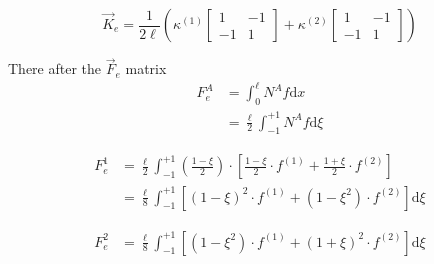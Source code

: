 \begin{equation}\label{Keass2}
\vec{K}_e = \frac{1}{2\ell} \left(
	\kappa^{(1)} \begin{bmatrix} 1 & -1 \\ -1 & 1 \end{bmatrix}
	+ \kappa^{(2)} \begin{bmatrix} 1 & -1 \\ -1 & 1 \end{bmatrix}
\right)
\end{equation}

There after the $\vec{F}_e$ matrix
\begin{equation}\label{Keass3}
\begin{aligned}
F_e^A &= \int_0^\ell N^A f \text{d}x \\
&= \frac{\ell}{2} \int_{-1}^{+1} N^A f \text{d} \xi
\end{aligned}
\end{equation}


\begin{equation}\label{Feass4}
\begin{aligned}
F_e^1 &= \frac{\ell}{2} \int_{-1}^{+1} \left(\frac{1-\xi}{2}\right) \cdot \left[
	\frac{1-\xi}{2}\cdot f^{(1)}
	+ \frac{1+\xi}{2}\cdot f^{(2)}
\right] \\
&= \frac{\ell}{8} \int_{-1}^{+1} \left[
	\left(1-\xi\right)^2\cdot f^{(1)}
	+ \left(1-\xi^2\right)\cdot f^{(2)}
\right] \text{d} \xi
\end{aligned}
\end{equation}

\begin{equation}\label{Feass5}
\begin{aligned}
F_e^2 &= \frac{\ell}{8} \int_{-1}^{+1} \left[
	(1-\xi^2)\cdot f^{(1)} + (1+\xi)^2\cdot f^{(2)}
\right] \text{d}\xi
\end{aligned}
\end{equation}


